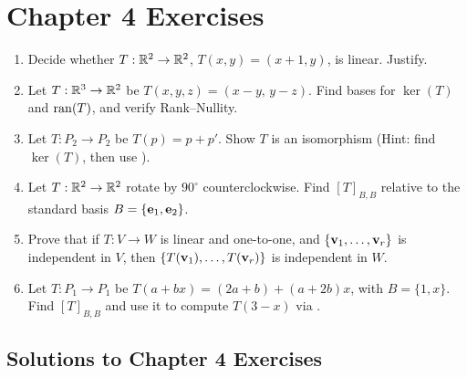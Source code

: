 \section*{Chapter 4 Exercises}

\begin{enumerate}[label=\textbf{4.\arabic*},leftmargin=2.6em,itemsep=6pt]
\item Decide whether $T:\mathbb{R}^2\to\mathbb{R}^2$, $T(x,y)=(x+1,y)$, is linear. Justify.

\item Let $T:\mathbb{R}^3\to\mathbb{R}^2$ be $T(x,y,z)=(x-y,\,y-z)$. Find bases for $\ker(T)$ and $\operatorname{ran}(T)$, and verify Rank--Nullity.

\item Let $T:P_2\to P_2$ be $T(p)=p+p'$. Show $T$ is an isomorphism (Hint: find $\ker(T)$, then use ).

\item Let $T:\mathbb{R}^2\to\mathbb{R}^2$ rotate by $90^\circ$ counterclockwise. Find $[T]_{B,B}$ relative to the standard basis $B=\{\mathbf{e}_1,\mathbf{e}_2\}$.

\item Prove that if $T:V\to W$ is linear and one-to-one, and $\{\mathbf{v}_1,\dots,\mathbf{v}_r\}$ is independent in $V$, then $\{T(\mathbf{v}_1),\dots,T(\mathbf{v}_r)\}$ is independent in $W$.

\item Let $T:P_1\to P_1$ be $T(a+bx)=(2a+b)+(a+2b)x$, with $B=\{1,x\}$. Find $[T]_{B,B}$ and use it to compute $T(3-x)$ via .
\end{enumerate}

\subsection*{Solutions to Chapter 4 Exercises}


